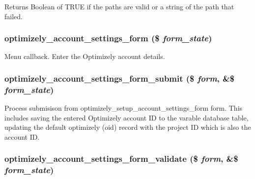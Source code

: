 \begin{DoxyReturn}{Returns}
Boolean of TRUE if the paths are valid or a string of the path that failed. 
\end{DoxyReturn}
\hypertarget{optimizely_8admin_8inc_ae966f802e083e18ee8da09dac92afab3}{
\subsubsection[{optimizely\_\-account\_\-settings\_\-form}]{\setlength{\rightskip}{0pt plus 5cm}optimizely\_\-account\_\-settings\_\-form (\$ {\em form\_\-state})}}
\label{optimizely_8admin_8inc_ae966f802e083e18ee8da09dac92afab3}
Menu callback. Enter the Optimizely account details. \hypertarget{optimizely_8admin_8inc_ae02dda6fe86e05f5b06a202a2d099b88}{
\subsubsection[{optimizely\_\-account\_\-settings\_\-form\_\-submit}]{\setlength{\rightskip}{0pt plus 5cm}optimizely\_\-account\_\-settings\_\-form\_\-submit (\$ {\em form}, \/  \&\$ {\em form\_\-state})}}
\label{optimizely_8admin_8inc_ae02dda6fe86e05f5b06a202a2d099b88}
Process submisison from optimizely\_\-setup\_\-account\_\-settings\_\-form form. This includes saving the entered Optimizely account ID to the varable database table, updating the default optimizely (oid) record with the project ID which is also the account ID. \hypertarget{optimizely_8admin_8inc_ab80ac0f449517fefe2a1672bfdc6e711}{
\subsubsection[{optimizely\_\-account\_\-settings\_\-form\_\-validate}]{\setlength{\rightskip}{0pt plus 5cm}optimizely\_\-account\_\-settings\_\-form\_\-validate (\$ {\em form}, \/  \&\$ {\em form\_\-state})}}
